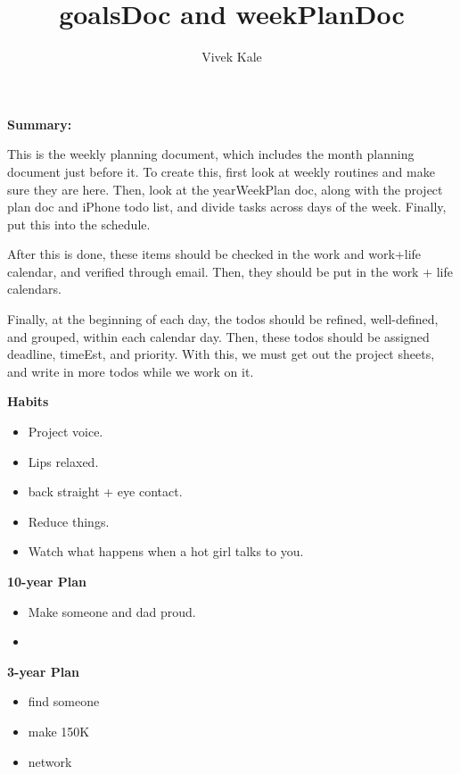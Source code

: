 \documentclass[11pt]{article}
\title{goalsDoc and weekPlanDoc}
\author{Vivek Kale}
\begin{document}
\maketitle 

\textbf{Summary:} {\small This is the weekly planning document, which includes 
the month planning document just before it. 
To create this, first look at weekly routines and make sure they are
here. Then, look at the yearWeekPlan doc, along with the project plan
doc and iPhone todo list, and divide tasks across days of the
week. Finally, put this into the schedule. 

After this is done, these items should be checked in the work and
work+life calendar, and verified through email. 
Then, they should be put in the work + life
calendars.

Finally, at the beginning of each day, the todos should be refined,
well-defined, and grouped, within each calendar day. Then, these todos
should be assigned deadline, timeEst, and priority. 
With this, we must get out the project sheets, and write in more todos
while we work on it. 
}

\newpage 

\textbf{Habits}
\begin{itemize}
\item \tiny Project voice. 
\item \tiny Lips relaxed.
  \tiny \item \tiny back straight + eye contact.
\item \tiny Reduce things.
\item \tiny Watch what happens when a hot girl talks to you.
\end{itemize} 

\newpage
\textbf{10-year Plan}
\begin{itemize}
\item \small Make someone and dad proud.
\item \small 
\end{itemize}

\textbf{3-year Plan} 
\begin{itemize} 
  \small \item \small find someone
\item \small make 150K
\item \small network
\end{itemize} 
\end{document}
